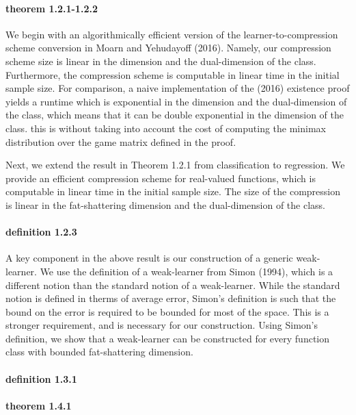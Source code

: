 \documentclass{article}
\begin{document}
\paragraph{theorem 1.2.1-1.2.2}
We begin with an algorithmically efficient version of the learner-to-compression scheme conversion in Moarn and Yehudayoff (2016).
Namely, our compression scheme size is linear in the dimension and the dual-dimension of the class. 
Furthermore, the compression scheme is computable in linear time in the initial sample size. 
For comparison,  a naive implementation of the   (2016) existence proof yields a runtime which is exponential in the dimension and the dual-dimension of the class, which means that it can be double exponential in the dimension of the class. this is without taking into account the cost of computing the minimax distribution over the game matrix defined in the proof. 

Next, we extend the result in Theorem 1.2.1 from classification to regression.
We provide an efficient  compression scheme for real-valued functions, which is computable in linear time in the initial sample size. The size of the compression is linear in the fat-shattering dimension and the dual-dimension of the class. 

\paragraph{definition 1.2.3}
A key component in the above result is our construction of a generic weak-learner.
We use the definition of a weak-learner from Simon (1994), which is a different notion than the standard notion of a weak-learner.
While the standard notion is defined in therms of average error, Simon's definition is such that the bound on the error is required to be bounded for most of the space.
This is a stronger requirement, and is necessary for our construction.
Using Simon's definition, we show that a weak-learner can be constructed for every function class with bounded fat-shattering dimension.

\paragraph{definition 1.3.1}

\paragraph{theorem 1.4.1}
\end{document}
